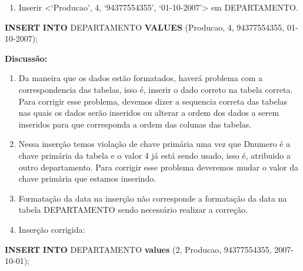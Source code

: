 \documentclass[
]{article}
\newenvironment{Shaded}{\begin{snugshade}}{\end{snugshade}}
\newcommand{\DecValTok}[1]{\textcolor[rgb]{0.00,0.00,0.81}{#1}}
\newcommand{\KeywordTok}[1]{\textcolor[rgb]{0.13,0.29,0.53}{\textbf{#1}}}
\newcommand{\NormalTok}[1]{#1}
\newcommand{\StringTok}[1]{\textcolor[rgb]{0.31,0.60,0.02}{#1}}
\providecommand{\tightlist}{%
  \setlength{\itemsep}{0pt}\setlength{\parskip}{0pt}}
\begin{document}
\begin{enumerate}
\def\labelenumi{\arabic{enumi}.}
\setcounter{enumi}{2}
\tightlist
\item
  Inserir \textless{}`Producao', 4, `94377554355',
  `01-10-2007'\textgreater{} em DEPARTAMENTO.
\end{enumerate}

\begin{Shaded}
\begin{Highlighting}[]
\KeywordTok{INSERT} \KeywordTok{INTO}\NormalTok{ DEPARTAMENTO }\KeywordTok{VALUES}\NormalTok{ (}\StringTok{\textquotesingle{}Producao\textquotesingle{}}\NormalTok{, }\DecValTok{4}\NormalTok{, }\StringTok{\textquotesingle{}94377554355\textquotesingle{}}\NormalTok{, }\StringTok{\textquotesingle{}01{-}10{-}2007\textquotesingle{}}\NormalTok{);}
\end{Highlighting}
\end{Shaded}

\textbf{Discussão:}

\begin{enumerate}
\def\labelenumi{\roman{enumi}.}
\item
  Da maneira que os dados estão formatados, haverá problema com a
  correspondencia das tabelas, isso é, inserir o dado correto na tabela
  correta. Para corrigir esse problema, devemos dizer a sequencia
  correta das tabelas nas quais os dados serão inseridos ou alterar a
  ordem dos dados a serem inseridos para que corresponda a ordem das
  colunas das tabelas.
\item
  Nessa inserção temos violação de chave primária uma vez que Dnumero é
  a chave primária da tabela e o valor 4 já está sendo usado, isso é,
  atribuido a outro departamento. Para corrigir esse problema deveremos
  mudar o valor da chave primária que estamos inserindo.
\item
  Formatação da data na inserção não corresponde a formatação da data na
  tabela DEPARTAMENTO sendo necessário realizar a correção.
\item
  Inserção corrigida:
\end{enumerate}

\begin{Shaded}
\begin{Highlighting}[]
\KeywordTok{INSERT} \KeywordTok{INTO}\NormalTok{ DEPARTAMENTO }\KeywordTok{values}\NormalTok{ (}\DecValTok{2}\NormalTok{, }\StringTok{\textquotesingle{}Producao\textquotesingle{}}\NormalTok{, }\StringTok{\textquotesingle{}94377554355\textquotesingle{}}\NormalTok{, }\StringTok{\textquotesingle{}2007{-}10{-}01\textquotesingle{}}\NormalTok{);}
\end{Highlighting}
\end{Shaded}
\end{document}
